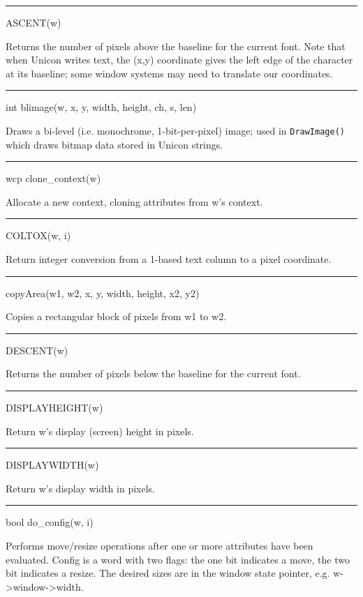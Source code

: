 {\sffamily\bfseries
\bigskip\hrule\vspace{0.1cm}
\noindent
ASCENT(w)}


Returns the number of pixels above the baseline for the current
font. Note that when Unicon writes text, the (x,y) coordinate gives
the left edge of the character at its baseline; some window systems
may need to translate our coordinates.

{\sffamily\bfseries
\bigskip\hrule\vspace{0.1cm}
\noindent
int blimage(w, x, y, width, height, ch, s, len)}

Draws a bi-level (i.e. monochrome, 1-bit-per-pixel) image; used in
\texttt{DrawImage()} which draws bitmap data stored in Unicon strings.

{\sffamily\bfseries
\bigskip\hrule\vspace{0.1cm}
\noindent
wcp clone\_context(w)}


Allocate a new context, cloning attributes from w's context.

{\sffamily\bfseries
\bigskip\hrule\vspace{0.1cm}
\noindent
COLTOX(w, i)}


Return integer conversion from a 1-based text column to a pixel coordinate.

{\sffamily\bfseries
\bigskip\hrule\vspace{0.1cm}
\noindent
copyArea(w1, w2, x, y, width, height, x2, y2)}


Copies a rectangular block of pixels from w1 to w2.

{\sffamily\bfseries
\bigskip\hrule\vspace{0.1cm}
\noindent
DESCENT(w)}


Returns the number of pixels below the baseline for the current font.


\bigskip\hrule\vspace{0.1cm}
\noindent
DISPLAYHEIGHT(w)


Return w's display (screen) height in pixels.

{\sffamily\bfseries
\bigskip\hrule\vspace{0.1cm}
\noindent
DISPLAYWIDTH(w)}


Return w's display width in pixels.

{\sffamily\bfseries
\bigskip\hrule\vspace{0.1cm}
\noindent
bool do\_config(w, i)}


Performs move/resize operations after one or more attributes have been
evaluated. Config is a word with two flags: the one bit indicates a
move, the two bit indicates a resize. The desired sizes are in the
window state pointer, e.g.
w-{\textgreater}window-{\textgreater}width.

